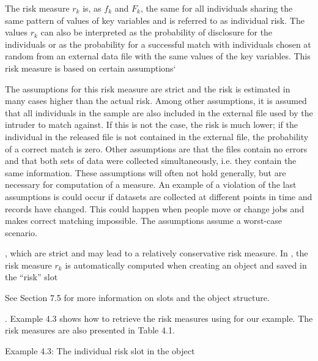 \documentclass[letterpaper,10pt,english]{sphinxmanual}
\begin{document}
The risk measure \(r_{k}\) is, as \(f_{k}\) and \(F_{k}\),
the same for all individuals sharing the same pattern of values of key
variables and is referred to as individual risk. The values
\(r_{k}\) can also be interpreted as the probability of disclosure
for the individuals or as the probability for a successful match with
individuals chosen at random from an external data file with the same
values of the key variables. This risk measure is based on certain
assumptions{}` %
\begin{footnote}[6]\sphinxAtStartFootnote
The assumptions for this risk measure are strict and the risk is
estimated in many cases higher than the actual risk. Among other
assumptions, it is assumed that all individuals in the sample are
also included in the external file used by the intruder to match
against. If this is not the case, the risk is much lower; if the
individual in the released file is not contained in the external
file, the probability of a correct match is zero. Other assumptions
are that the files contain no errors and that both sets of data were
collected simultaneously, i.e. they contain the same information.
These assumptions will often not hold generally, but are necessary
for computation of a measure. An example of a violation of the last
assumptions is could occur if datasets are collected at different
points in time and records have changed. This could happen when
people move or change jobs and makes correct matching impossible. The
assumptions assume a worst-case scenario.
%
\end{footnote}, which are strict and may lead to a
relatively conservative risk measure. In , the risk measure
\(r_{k}\) is automatically computed when creating an 
object and saved in the “risk” slot %
\begin{footnote}[7]\sphinxAtStartFootnote
See Section 7.5 for more information on slots and the 
object structure.
%
\end{footnote}. Example 4.3
shows how to retrieve the risk measures using  for our
example. The risk measures are also presented in Table 4.1.

Example 4.3: The individual risk slot in the  object
\end{document}
